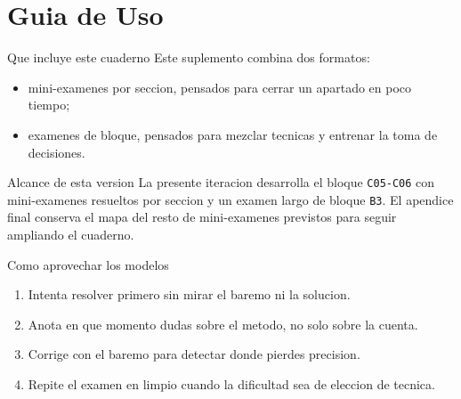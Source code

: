 \chapter{Guia de Uso}

\begin{planningbox}{Que incluye este cuaderno}
Este suplemento combina dos formatos:
\begin{itemize}
  \item mini-examenes por seccion, pensados para cerrar un apartado en poco tiempo;
  \item examenes de bloque, pensados para mezclar tecnicas y entrenar la toma de decisiones.
\end{itemize}
\end{planningbox}

\begin{databox}{Alcance de esta version}
La presente iteracion desarrolla el bloque \texttt{C05-C06} con mini-examenes resueltos por
seccion y un examen largo de bloque \texttt{B3}. El apendice final conserva el mapa del resto
de mini-examenes previstos para seguir ampliando el cuaderno.
\end{databox}

\begin{methodbox}{Como aprovechar los modelos}
\begin{enumerate}
  \item Intenta resolver primero sin mirar el baremo ni la solucion.
  \item Anota en que momento dudas sobre el metodo, no solo sobre la cuenta.
  \item Corrige con el baremo para detectar donde pierdes precision.
  \item Repite el examen en limpio cuando la dificultad sea de eleccion de tecnica.
\end{enumerate}
\end{methodbox}
